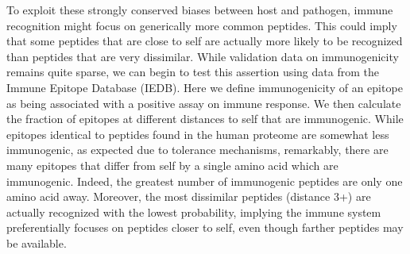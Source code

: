 \documentclass[superscriptaddress,twocolumn,pre]{revtex4}
\newcommand{\<}{\langle}
\renewcommand{\>}{\rangle}
\begin{document}
To exploit these strongly conserved biases between host and pathogen, immune recognition might focus on generically more common peptides. This could imply that some peptides that are close to self are actually more likely to be recognized than peptides that are very dissimilar. While validation data on immunogenicity remains quite sparse, we can begin to test this assertion using data from the Immune Epitope Database (IEDB). Here we define immunogenicity of an epitope as being associated with a positive assay on immune response. We then calculate the fraction of epitopes at different distances to self that are immunogenic. While epitopes identical to peptides found in the human proteome are somewhat less immunogenic, as expected due to tolerance mechanisms, remarkably, there are many epitopes that differ from self by a single amino acid which are immunogenic. Indeed, the greatest number of immunogenic peptides are only one amino acid away. Moreover, the most dissimilar peptides (distance 3+) are actually recognized with the lowest probability,  implying the immune system preferentially focuses on peptides closer to self, even though farther peptides may be available.


%
%
\end{document}
